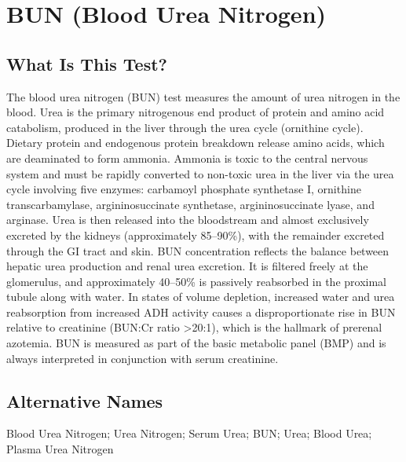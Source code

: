 \chapter{BUN (Blood Urea Nitrogen)}

\section*{What Is This Test?}
The blood urea nitrogen (BUN) test measures the amount of urea nitrogen in the blood. Urea is the primary nitrogenous end product of protein and amino acid catabolism, produced in the liver through the urea cycle (ornithine cycle). Dietary protein and endogenous protein breakdown release amino acids, which are deaminated to form ammonia. Ammonia is toxic to the central nervous system and must be rapidly converted to non-toxic urea in the liver via the urea cycle involving five enzymes: carbamoyl phosphate synthetase I, ornithine transcarbamylase, argininosuccinate synthetase, argininosuccinate lyase, and arginase. Urea is then released into the bloodstream and almost exclusively excreted by the kidneys (approximately 85--90\%), with the remainder excreted through the GI tract and skin. BUN concentration reflects the balance between hepatic urea production and renal urea excretion. It is filtered freely at the glomerulus, and approximately 40--50\% is passively reabsorbed in the proximal tubule along with water. In states of volume depletion, increased water and urea reabsorption from increased ADH activity causes a disproportionate rise in BUN relative to creatinine (BUN:Cr ratio >20:1), which is the hallmark of prerenal azotemia. BUN is measured as part of the basic metabolic panel (BMP) and is always interpreted in conjunction with serum creatinine.

\section*{Alternative Names}
Blood Urea Nitrogen; Urea Nitrogen; Serum Urea; BUN; Urea; Blood Urea; Plasma Urea Nitrogen

